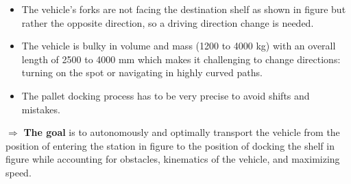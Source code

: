 \begin{itemize}
    \item The vehicle’s forks are not facing the destination shelf as shown in figure  
    but rather the opposite direction, 
    so a driving direction change is needed. 

    \item The vehicle is bulky in volume and mass (1200 to 4000 kg) with an overall 
    length of 2500 to 4000 mm  \cite{R5}
    which makes it challenging  to change directions: turning on the spot or 
    navigating in highly curved paths. 
    
    \item The pallet docking process has to be very precise to avoid shifts and mistakes. 
\end{itemize}

$\Rightarrow$ \textbf{The goal} is to autonomously and optimally transport the vehicle from the position of entering the station in
figure  to the position of docking the shelf in figure  while accounting for obstacles,
kinematics of the vehicle, and maximizing speed. 


